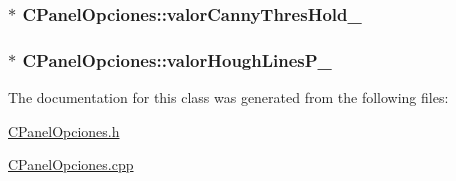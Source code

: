 \subsubsection[{\texorpdfstring{valor\+Canny\+Thres\+Hold\+\_\+}{valorCannyThresHold_}}]{$\ast$ C\+Panel\+Opciones\+::valor\+Canny\+Thres\+Hold\+\_\+\hspace{0.3cm}{\ttfamily [private]}}\hypertarget{classCPanelOpciones_a09a2c503f1520a71866669fd84b95ebf}{}\label{classCPanelOpciones_a09a2c503f1520a71866669fd84b95ebf}
\subsubsection[{\texorpdfstring{valor\+Hough\+Lines\+P\+\_\+}{valorHoughLinesP_}}]{$\ast$ C\+Panel\+Opciones\+::valor\+Hough\+Lines\+P\+\_\+\hspace{0.3cm}{\ttfamily [private]}}\hypertarget{classCPanelOpciones_ab415dcfa099eb5bc1fe6e576fe50e4ca}{}\label{classCPanelOpciones_ab415dcfa099eb5bc1fe6e576fe50e4ca}


The documentation for this class was generated from the following files\+:\begin{DoxyCompactItemize}
\item 
\hyperlink{CPanelOpciones_8h}{C\+Panel\+Opciones.\+h}\item 
\hyperlink{CPanelOpciones_8cpp}{C\+Panel\+Opciones.\+cpp}\end{DoxyCompactItemize}
